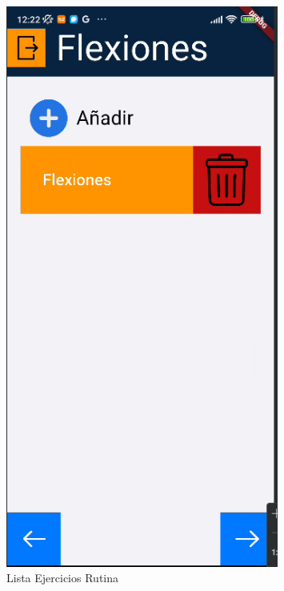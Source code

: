 \begin{figure}[H]
   \centering
    \includegraphics[width=0.8\textwidth]{pantallas/listaEjerRutina.png}
    \caption{Lista Ejercicios Rutina}
    \label{fig:listaEjerRutina}
\end{figure}

